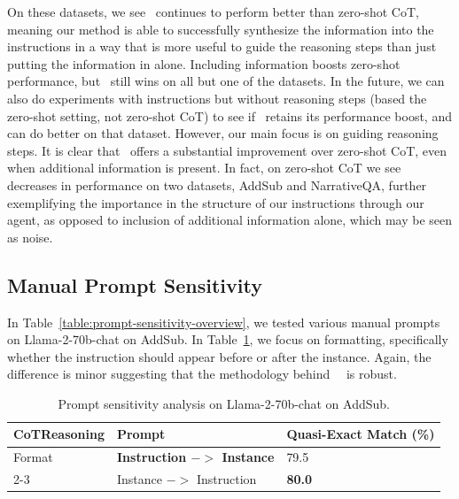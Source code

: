 On these datasets, we see \method\ continues to perform better than zero-shot CoT, meaning our method is able to successfully synthesize the information into the instructions in a way that is more useful to guide the reasoning steps than just putting the information in alone. Including information boosts zero-shot performance, but \method\ still wins on all but one of the datasets. In the future, we can also do experiments with instructions but without reasoning steps (based the zero-shot setting, not zero-shot CoT) to see if \method\ retains its performance boost, and can do better on that dataset. However, our main focus is on guiding reasoning steps. It is clear that \method\ offers a substantial improvement over zero-shot CoT, even when additional information is present. In fact, on zero-shot CoT we see decreases in performance on two datasets, AddSub and NarrativeQA, further exemplifying the importance in the structure of our instructions through our agent, as opposed to inclusion of additional information alone, which may be seen as noise.

\subsection{Manual Prompt Sensitivity}
\label{sec:prompt-sensitivity-1}
In Table~\ref{table:prompt-sensitivity-overview}, we tested various manual prompts on Llama-2-70b-chat on AddSub. In Table~\ref{table:prompt-sensitivity-overview-appendix}, we focus on formatting, specifically whether the instruction should appear before or after the instance. Again, the difference is minor suggesting that the methodology behind \zeroshotmid\ \method\ is robust.

\begin{table}[h]
\caption{Prompt sensitivity analysis on Llama-2-70b-chat on AddSub.}
\label{table:prompt-sensitivity-overview-appendix}
\vskip 0.1in
\centering
\small
\begin{tabular}{p{1.5cm}p{4cm}p{2cm}}
\toprule
CoT\hspace{5mm}Reasoning & Prompt & Quasi-Exact Match (\%) \\
\midrule
Format & \textbf{Instruction $->$ Instance} & 79.5 \\ \cmidrule(r){2-3}
& Instance $->$ Instruction & \textbf{80.0} \\
\bottomrule
\end{tabular}
\end{table}


